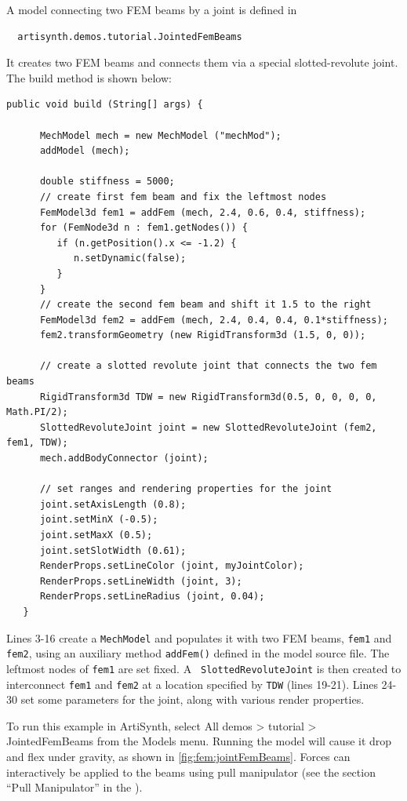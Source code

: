 A model connecting two FEM beams by a joint
is defined in
%
\begin{verbatim}
  artisynth.demos.tutorial.JointedFemBeams
\end{verbatim}
%
It creates two FEM beams and connects them via a special slotted-revolute
joint. The build method is shown below:
\lstset{numbers=left}
\begin{lstlisting}[]
   public void build (String[] args) {
      
      MechModel mech = new MechModel ("mechMod");
      addModel (mech);
      
      double stiffness = 5000;
      // create first fem beam and fix the leftmost nodes      
      FemModel3d fem1 = addFem (mech, 2.4, 0.6, 0.4, stiffness);
      for (FemNode3d n : fem1.getNodes()) {
         if (n.getPosition().x <= -1.2) {
            n.setDynamic(false);
         }
      }
      // create the second fem beam and shift it 1.5 to the right
      FemModel3d fem2 = addFem (mech, 2.4, 0.4, 0.4, 0.1*stiffness);
      fem2.transformGeometry (new RigidTransform3d (1.5, 0, 0));

      // create a slotted revolute joint that connects the two fem beams
      RigidTransform3d TDW = new RigidTransform3d(0.5, 0, 0, 0, 0, Math.PI/2);
      SlottedRevoluteJoint joint = new SlottedRevoluteJoint (fem2, fem1, TDW);
      mech.addBodyConnector (joint);
      
      // set ranges and rendering properties for the joint
      joint.setAxisLength (0.8);
      joint.setMinX (-0.5);
      joint.setMaxX (0.5);
      joint.setSlotWidth (0.61);
      RenderProps.setLineColor (joint, myJointColor);
      RenderProps.setLineWidth (joint, 3);
      RenderProps.setLineRadius (joint, 0.04);
   }
\end{lstlisting}
\lstset{numbers=none} Lines 3-16 create a {\tt MechModel} and
populates it with two FEM beams, {\tt fem1} and {\tt fem2}, using an
auxiliary method {\tt addFem()} defined in the model source file.  The
leftmost nodes of {\tt fem1} are set fixed. A {\tt
SlottedRevoluteJoint} is then created to interconnect {\tt fem1} and
{\tt fem2} at a location specified by {\tt TDW} (lines 19-21).  Lines
24-30 set some parameters for the joint, along with various render
properties.

To run this example in ArtiSynth, select {\sf All demos > tutorial >
JointedFemBeams} from the {\sf Models} menu. Running the model will
cause it drop and flex under gravity, as shown in 
\ref{fig:fem:jointFemBeams}. Forces can interactively
be applied to the beams using
pull manipulator 
(see the section ``Pull Manipulator'' in the
).

